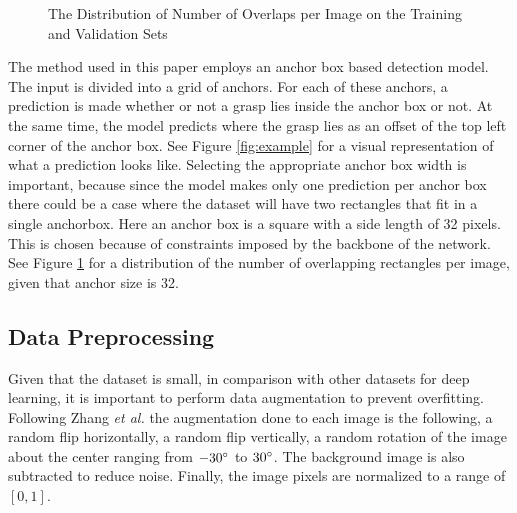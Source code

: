 \documentclass{article}
\begin{document}
\begin{figure}
\centering
{}
\qquad
{}
\caption{The Distribution of Number of Overlaps per Image on the Training and Validation Sets}
\label{fig:overlapdist}
\end{figure}

The method used in this paper employs an anchor box
based detection model. The input is divided into a grid of anchors. For each of
these anchors, a prediction is made whether or not a grasp lies inside the
anchor box or not. At the same time, the model predicts where the grasp lies
as an offset of the top left corner of the anchor box. See Figure \ref{fig:example}
for a visual representation of what a prediction looks like.
Selecting the appropriate anchor box width is important, because
since the model makes only one prediction per anchor box there could
be a case where the dataset will have two rectangles that fit in a single
anchorbox.
Here an anchor box is a square with a side length of 32 pixels. This
is chosen because of constraints imposed by the backbone of the network.
See Figure \ref{fig:overlapdist} for a distribution of the number
of overlapping rectangles per image, given that anchor size is 32.

\subsection{Data Preprocessing}
Given that the dataset is small, in comparison with other datasets for deep
learning, it is important to perform data augmentation to prevent overfitting.
Following Zhang \textit{et al.} \cite{zhang18} the augmentation done to each
image is the following, a random flip horizontally, a random flip vertically,
a random rotation of the image about the center ranging from $-30\degree$ to
$30\degree$. The background image is also subtracted to reduce noise. Finally,
the image pixels are normalized to a range of $[0,1]$.
\end{document}
